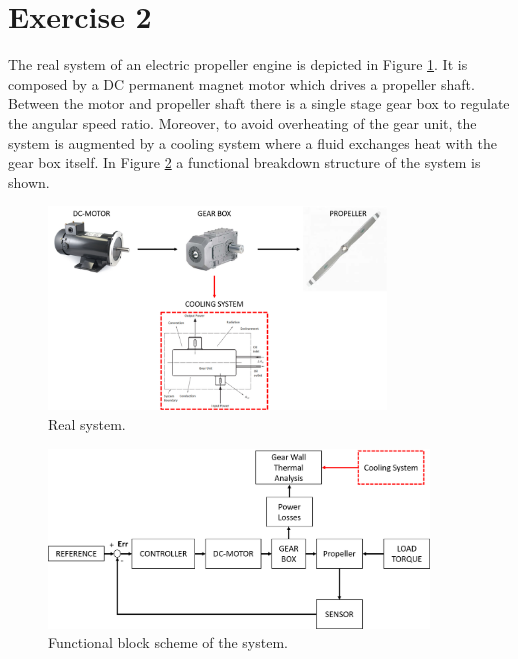\documentclass[11pt,a4paper,oneside]{article}
\begin{document}
\clearpage
\section{Exercise 2}
The real system of an electric propeller engine is depicted in Figure \ref{fig:propeller}.
It is composed by a DC permanent magnet motor which drives a propeller shaft.
Between the motor and propeller shaft there is a single stage gear box to regulate the angular speed ratio.
Moreover, to avoid overheating of the gear unit, the system is augmented by a cooling system where a fluid exchanges heat with the gear box itself.
In Figure \ref{fig:blocks scheme} a functional breakdown structure of the system is shown. 

\begin{figure}[ht!]
    \centering
    \includegraphics[width=0.8\textwidth]{Figures/RealSystem_msas.png}
    \caption{\label{fig:propeller} Real system.}
\end{figure}

\begin{figure}[ht!]
    \centering
    \includegraphics[width=0.9\textwidth]{Figures/BlockScheme_msas.png}
    \caption{\label{fig:blocks scheme} Functional block scheme of the system.}
\end{figure}
\end{document}
